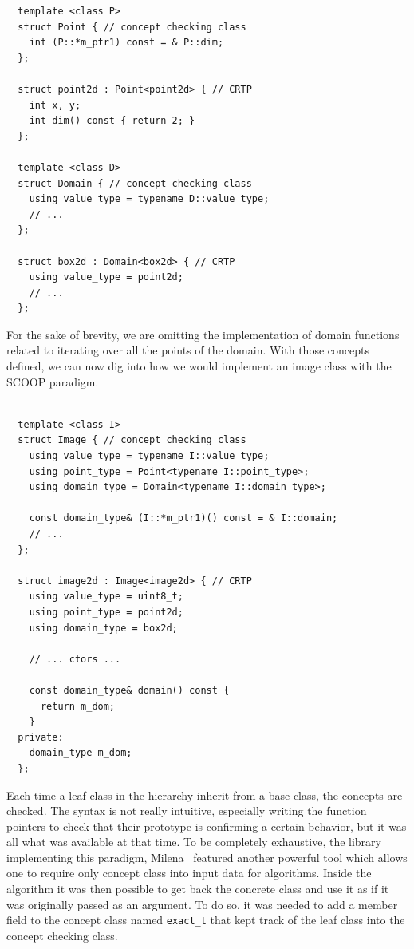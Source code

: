 \begin{verbatim}
  template <class P>
  struct Point { // concept checking class
    int (P::*m_ptr1) const = & P::dim;
  };

  struct point2d : Point<point2d> { // CRTP
    int x, y;
    int dim() const { return 2; }
  };

  template <class D>
  struct Domain { // concept checking class
    using value_type = typename D::value_type;
    // ...
  };

  struct box2d : Domain<box2d> { // CRTP
    using value_type = point2d;
    // ...
  };
\end{verbatim}

For the sake of brevity, we are omitting the implementation of domain functions related to iterating over all the points
of the domain. With those concepts defined, we can now dig into how we would implement an image class with the SCOOP
paradigm.

\begin{verbatim}

  template <class I>
  struct Image { // concept checking class
    using value_type = typename I::value_type;
    using point_type = Point<typename I::point_type>;
    using domain_type = Domain<typename I::domain_type>;

    const domain_type& (I::*m_ptr1)() const = & I::domain;
    // ...
  };

  struct image2d : Image<image2d> { // CRTP
    using value_type = uint8_t;
    using point_type = point2d;
    using domain_type = box2d;

    // ... ctors ...

    const domain_type& domain() const {
      return m_dom;
    }
  private:
    domain_type m_dom;
  };
\end{verbatim}

Each time a leaf class in the hierarchy inherit from a base class, the concepts are checked. The syntax is not really
intuitive, especially writing the function pointers to check that their prototype is confirming a certain behavior, but
it was all what was available at that time. To be completely exhaustive, the library implementing this paradigm,
Milena~\parencite{levillain.2010.icip, levillain.2009.ismm} featured another powerful tool which allows one to require
only concept class into input data for algorithms. Inside the algorithm it was then possible to get back the concrete
class and use it as if it was originally passed as an argument. To do so, it was needed to add a member field to the
concept class named \texttt{exact\_t} that kept track of the leaf class into the concept checking class.

